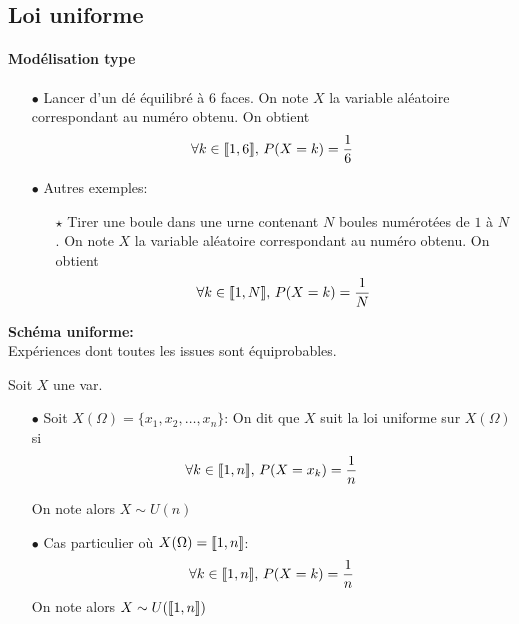 \documentclass[a4paper, 11pt]{article}
\begin{document}
\subsection{Loi uniforme}



\paragraph{Mod\'elisation type}

\begin{itemize}
\item[$\bullet$] Lancer d'un dé équilibré à $6$ faces. On note $X$ la variable aléatoire correspondant au numéro obtenu. On obtient 
$$\forall k\in \llbracket 1,6\rrbracket,\,  P(X=k ) =\frac{1}{6}$$
\item[$\bullet$] Autres exemples:
\begin{itemize}
\item[$\star$]  Tirer une boule dans une urne contenant $N$  boules numérotées de $1$ à $N$. On note $X$ la variable aléatoire correspondant au numéro obtenu. On obtient 
$$\forall k\in \llbracket 1,N\rrbracket,\,  P(X=k ) =\frac{1}{N}$$
\end{itemize}
\end{itemize}

\begin{dboxminipage}{0.7 \textwidth}
\textbf{\large{Sch\'ema uniforme:}}\\
 Exp\'eriences dont toutes les issues sont \'equiprobables.
\end{dboxminipage}




\hspace{-0.7cm} {  

\begin{defi} Soit $X$ une var.
\begin{itemize}
\item[$\bullet$] Soit $X(\Omega)=\lbrace x_1,x_2,\dots,x_n\rbrace$:
 On dit que $X$ suit la loi uniforme sur $X(\Omega)$ si
 $$\forall  k\in \llbracket 1,n\rrbracket,\,  P(X=x_k ) =\frac{1}{n}$$


 On note alors $X\sim U(n)$
\item[$\bullet$] Cas particulier o\`{u} $X(\Omega)=\llbracket  1,n\rrbracket$:
 $$\forall  k\in \llbracket 1,n\rrbracket,\,  P(X=k ) =\frac{1}{n}$$
 On note alors $X\sim U(\llbracket 1,n\rrbracket)$
\end{itemize}
\end{defi}
 
}
 
\end{document}

